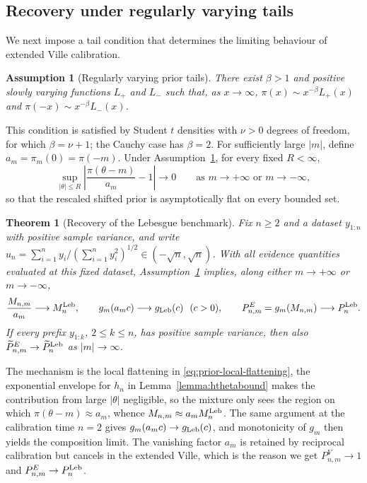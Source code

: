 \documentclass{article}
\newtheorem{theorem}{Theorem}
\newtheorem{assumption}{Assumption}
\begin{document}
\subsection{Recovery under regularly varying tails}
\label{subsec:recovery}\vspace{-4pt}
We next impose a tail condition that determines the limiting behaviour of extended Ville calibration.

\begin{assumption}[Regularly varying prior tails]
\label{ass:tails}
There exist $\beta>1$ and positive slowly varying functions $L_+$ and
$L_-$ such that, as $x\to\infty$, $\pi(x)\sim x^{-\beta}L_+(x)$ and
$\pi(-x)\sim x^{-\beta}L_-(x)$.
\end{assumption}

This condition is satisfied by Student $t$ densities with $\nu>0$ degrees
of freedom, for which $\beta=\nu+1$; the Cauchy case has $\beta=2$. For
sufficiently large $|m|$, define $a_m=\pi_m(0)=\pi(-m)$. Under
Assumption~\ref{ass:tails}, for every fixed $R<\infty$,
\vspace{-4pt}
\begin{equation}
\label{eq:prior-local-flattening}
  \sup_{|\theta|\leq R}
  \left|\frac{\pi(\theta-m)}{a_m}-1\right|\longrightarrow0
  \qquad\text{as }m\to+\infty\text{ or }m\to-\infty,
\end{equation}
so that the rescaled shifted prior is asymptotically flat on every
bounded set.

\begin{theorem}[Recovery of the Lebesgue benchmark]
\label{thm:recovery}
Fix $n\geq2$ and a dataset $y_{1:n}$ with positive sample variance, and
write
$u_n=\sum_{i=1}^ny_i/(\sum_{i=1}^ny_i^2)^{1/2}\in(-\sqrt n,\sqrt n)$.
With all evidence quantities evaluated at this fixed dataset,
Assumption~\ref{ass:tails} implies, along either $m\to+\infty$ or
$m\to-\infty$,
\begin{equation}
\label{eq:recovery-limits}
  \frac{M_{n,m}}{a_m}\longrightarrow M_n^{\mathrm{Leb}},
  \qquad
  g_m(a_mc)\longrightarrow g_{\mathrm{Leb}}(c)\ \ (c>0),
  \qquad
  P_{n,m}^E=g_m(M_{n,m})\longrightarrow P_n^{\mathrm{Leb}} .
\end{equation}
If every prefix $y_{1:k}$, $2\leq k\leq n$, has positive sample variance,
then also $\widetilde P_{n,m}^E\to\widetilde P_n^{\mathrm{Leb}}$ as
$|m|\to\infty$.
\end{theorem}

The mechanism is the local flattening in
\eqref{eq:prior-local-flattening}, the exponential envelope for $h_n$ in Lemma~\ref{lemma:hthetabound} makes the contribution from large $|\theta|$ negligible, so the mixture only sees the region on which
$\pi(\theta-m)\approx a_m$, whence $M_{n,m}\approx a_mM_n^{\mathrm{Leb}}$. The same argument at the calibration time $n=2$ gives $g_m(a_mc)\to g_{\mathrm{Leb}}(c)$, and monotonicity of $g_m$ then yields the composition limit. The vanishing factor $a_m$ is retained by reciprocal calibration but cancels in the extended Ville, which is the reason we get $P_{n,m}^V\to1$ and $P_{n,m}^E\to P_n^{\mathrm{Leb}}$.
\vspace{-4pt}
\end{document}

